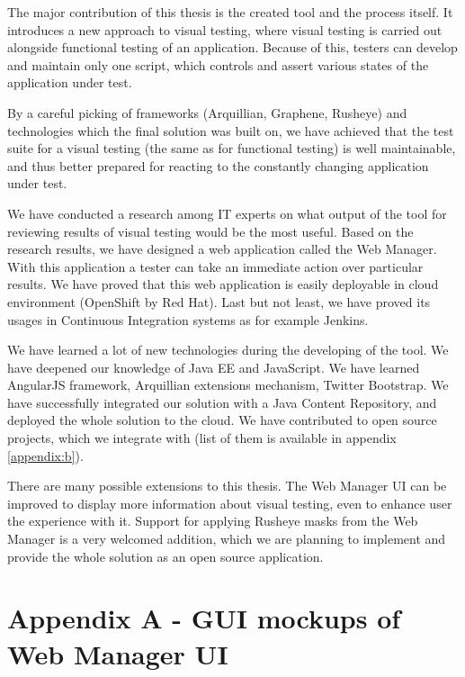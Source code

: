 \documentclass[11pt,oneside,final]{fithesis2}
\begin{document}
The major contribution of this thesis is the created tool and the process itself. It introduces a new approach to visual testing, where
visual testing is carried out alongside functional testing of an application. Because of this, testers can develop and maintain only one
script, which controls and assert various states of the application under test.

By a careful picking of frameworks (Arquillian, Graphene, Rusheye) and technologies which the final solution was built on, we have 
achieved that the test suite for a visual testing (the same as for functional testing) is well maintainable, and thus better prepared for reacting 
to the constantly changing application under test.

We have conducted a research among IT experts on what output of the tool for reviewing results of visual testing would be the most useful. Based
on the research results, we have designed a web application called the Web Manager. With this application a tester can take an immediate action
over particular results. We have proved that this web application is easily deployable in cloud environment (OpenShift by Red Hat). Last but
not least, we have proved its usages in Continuous Integration systems as for example Jenkins.

We have learned a lot of new technologies during the developing of the tool. We have deepened our knowledge of Java EE and JavaScript. 
We have learned AngularJS framework, Arquillian extensions mechanism, Twitter Bootstrap. We have successfully integrated our solution with
a Java Content Repository, and deployed the whole solution to the cloud. We have contributed to open source projects, which we integrate 
with (list of them is available in appendix \ref{appendix:b}).

There are many possible extensions to this thesis. The Web Manager UI can be improved to display more information about visual testing,
even to enhance user the experience with it. Support for applying Rusheye masks from the Web Manager is a very welcomed addition, which we are planning
to implement and provide the whole solution as an open source application.

\appendix
\chapter{Appendix A - GUI mockups of Web Manager UI}
\label{appendeix:a}
\end{document}
